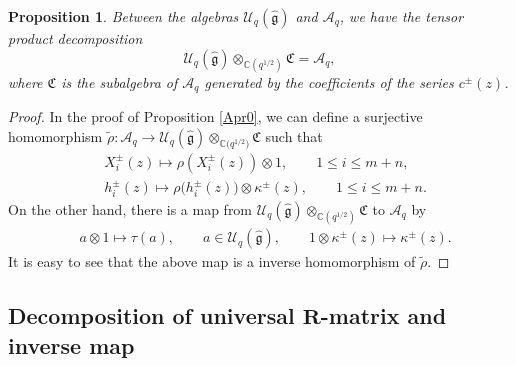 \documentclass[pdftex]{sigma}
\numberwithin{equation}{section}
\newtheorem{Proposition}[Theorem]{Proposition}
 { \theoremstyle{definition}
\newtheorem{Definition}[Theorem]{Definition}
\newtheorem{Note}[Theorem]{Note}
\newtheorem{Example}[Theorem]{Example}
\newtheorem{Remark}[Theorem]{Remark} }
\begin{document}
\begin{Proposition}\label{Apr1}Between the algebras $\mathcal{U}_q(\mathfrak{\hat{g}})$ and $\mathcal{A}_q$, we have the tensor product decomposition
\[%
 \mathcal{U}_q(\mathfrak{\hat{g}})\otimes_{\mathbb{C}(q^{1/2})}\mathfrak{C}=\mathcal{A}_q,
\]
where $\mathfrak{C}$ is the subalgebra of $\mathcal{A}_q$ generated by the coefficients of the series $c^{\pm}(z)$.
\end{Proposition}

\begin{proof}In the proof of Proposition \ref{Apr0}, we can define a surjective homomorphism $\tilde{\rho}\colon\mathcal{A}_q\rightarrow \mathcal{U}_q(\mathfrak{\hat{g}})\otimes_{\mathbb{C}\bigl(q^{1/2}\bigr)}\mathfrak{C}$ such that
\begin{align*}
 & X_i^{\pm}(z)\mapsto \rho(X_i^{\pm}(z))\otimes1,\qquad 1\leq i\leq m+n,\\
 &h_i^{\pm}(z)\mapsto \rho\bigl(h_i^{\pm}(z)\bigr)\otimes\kappa^{\pm}(z),\qquad 1\leq i\leq m+n.
\end{align*}
On the other hand, there is a map from $\mathcal{U}_q(\mathfrak{\hat{g}})\otimes_{\mathbb{C}(q^{1/2})}\mathfrak{C}$ to
$\mathcal{A}_q$ by
\begin{align*}
 & a\otimes1\mapsto\tau(a),\qquad a\in \mathcal{U}_q(\mathfrak{\hat{g}}),\qquad 1\otimes\kappa^{\pm}(z)\mapsto\kappa^{\pm}(z).
\end{align*}
It is easy to see that the above map is a inverse homomorphism of $\tilde{\rho}$.
\end{proof}


\subsection[Decomposition of universal R-matrix and inverse map]{Decomposition of universal $\boldsymbol{R}$-matrix and inverse map}
\end{document}
